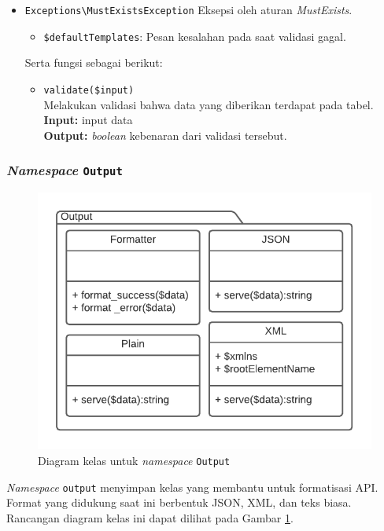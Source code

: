 \begin{itemize}
        \item \texttt{Exceptions\textbackslash MustExistsException} Eksepsi oleh aturan
            \textit{MustExists}.
            \begin{itemize}
                \item \texttt{\$defaultTemplates}: Pesan kesalahan pada saat
                validasi gagal.
            \end{itemize}
            Serta fungsi sebagai berikut:
            \begin{itemize}
                \item \texttt{validate(\$input)} \\
                    Melakukan validasi bahwa data yang diberikan terdapat pada
                    tabel.\\
                    \textbf{Input:} input data\\
                    \textbf{Output:} \textit{boolean} kebenaran dari validasi
                    tersebut.
            \end{itemize}
    \end{itemize}

\subsubsection{\textit{Namespace} \texttt{Output}}
    \begin{figure}
        \centering
        \includegraphics{Gambar/classmap-be/Classmap - app-output.pdf}
        \caption{Diagram kelas untuk \textit{namespace} \texttt{Output}}
        \label{fig:classmap_app-output}
    \end{figure}
    \textit{Namespace} \texttt{output} menyimpan kelas yang membantu untuk
    formatisasi API. Format yang didukung saat ini berbentuk JSON, XML, dan teks
    biasa. Rancangan diagram kelas ini dapat dilihat pada Gambar
    \ref{fig:classmap_app-output}.
    
